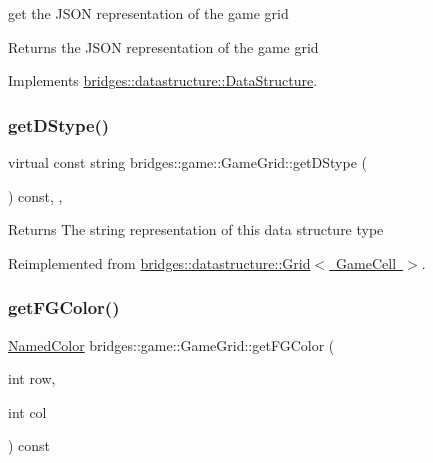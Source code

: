 get the J\+S\+ON representation of the game grid

\begin{DoxyReturn}{Returns}
the J\+S\+ON representation of the game grid 
\end{DoxyReturn}


Implements \mbox{\hyperlink{classbridges_1_1datastructure_1_1_data_structure}{bridges\+::datastructure\+::\+Data\+Structure}}.

\mbox{\label{classbridges_1_1game_1_1_game_grid_a07da19700a077e3d0f2cde2cade2ba60}} 
\subsubsection{\texorpdfstring{getDStype()}{getDStype()}}
{\footnotesize\ttfamily virtual const string bridges\+::game\+::\+Game\+Grid\+::get\+D\+Stype (\begin{DoxyParamCaption}{ }\end{DoxyParamCaption}) const\hspace{0.3cm}{\ttfamily [inline]}, {\ttfamily [override]}, {\ttfamily [virtual]}}

\begin{DoxyReturn}{Returns}
The string representation of this data structure type 
\end{DoxyReturn}


Reimplemented from \mbox{\hyperlink{classbridges_1_1datastructure_1_1_grid_a16aeae38446b96f440dea15f2b19334d}{bridges\+::datastructure\+::\+Grid$<$ Game\+Cell $>$}}.

\mbox{\label{classbridges_1_1game_1_1_game_grid_a6d38c8ac0d4ccbdd1b2b1c5d2f445d9a}} 
\subsubsection{\texorpdfstring{getFGColor()}{getFGColor()}}
{\footnotesize\ttfamily \mbox{\hyperlink{namespacebridges_1_1game_afaa832a4322b25b6a4ebfba832f10f26}{Named\+Color}} bridges\+::game\+::\+Game\+Grid\+::get\+F\+G\+Color (\begin{DoxyParamCaption}\item[{int}]{row,  }\item[{int}]{col }\end{DoxyParamCaption}) const\hspace{0.3cm}{\ttfamily [inline]}}

